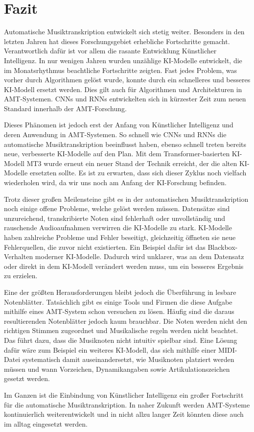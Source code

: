 \section{Fazit}
Automatische Musiktranskription entwickelt sich stetig weiter.
Besonders in den letzten Jahren hat dieses Forschungsgebiet erhebliche Fortschritte gemacht.
Verantwortlich dafür ist vor allem die rasante Entwicklung Künstlicher Intelligenz.
In nur wenigen Jahren wurden unzählige KI-Modelle entwickelt, die im Monatsrhythmus beachtliche Fortschritte zeigten.
Fast jedes Problem, was vorher durch Algorithmen gelöst wurde,
konnte durch ein schnelleres und besseres KI-Modell ersetzt werden.
Dies gilt auch für Algorithmen und Architekturen in AMT-Systemen.
CNNs und RNNs entwickelten sich in kürzester Zeit zum neuen Standard innerhalb der AMT-Forschung.

Dieses Phänomen ist jedoch erst der Anfang von Künstlicher Intelligenz und deren Anwendung in AMT-Systemen.
So schnell wie CNNs und RNNs die automatische Musiktranskription beeinflusst haben,
ebenso schnell treten bereits neue, verbesserte KI-Modelle auf den Plan.
Mit dem Transformer-basierten KI-Modell MT3 wurde erneut ein neuer Stand der Technik erreicht,
der die alten KI-Modelle ersetzten sollte.
Es ist zu erwarten, dass sich dieser Zyklus noch vielfach wiederholen wird,
da wir uns noch am Anfang der KI-Forschung befinden.

Trotz dieser großen Meilensteine gibt es in der automatischen Musiktranskription noch einige offene Probleme,
welche gelöst werden müssen.
Datensätze sind unzureichend, transkribierte Noten sind fehlerhaft oder unvollständig
und rauschende Audioaufnahmen verwirren die KI-Modelle zu stark.
KI-Modelle haben zahlreiche Probleme und Fehler beseitigt,
gleichzeitig öffneten sie neue Fehlerquellen, die zuvor nicht existierten.
Ein Beispiel dafür ist das Blackbox-Verhalten moderner KI-Modelle.
Dadurch wird unklarer, was an dem Datensatz oder direkt in dem KI-Modell verändert werden muss,
um ein besseres Ergebnis zu erzielen.

Eine der größten Herausforderungen bleibt jedoch die Überführung in lesbare Notenblätter.
Tatsächlich gibt es einige Tools und Firmen die diese Aufgabe mithilfe eines AMT-System schon versuchen zu lösen.
Häufig sind die daraus resultierenden Notenblätter jedoch kaum brauchbar.
Die Noten werden nicht den richtigen Stimmen zugeordnet und Musikalische regeln werden nicht beachtet.
Das führt dazu, dass die Musiknoten nicht intuitiv spielbar sind.
Eine Lösung dafür wäre zum Beispiel ein weiteres KI-Modell,
das sich mithilfe einer MIDI-Datei systematisch damit auseinandersetzt,
wie Musiknoten platziert werden müssen und wann Vorzeichen, Dynamikangaben sowie Artikulationszeichen gesetzt werden.

Im Ganzen ist die Einbindung von Künstlicher Intelligenz ein großer Fortschritt für die automatische Musiktranskription.
In naher Zukunft werden AMT-Systeme kontinuierlich weiterentwickelt
und in nicht allzu langer Zeit könnten diese auch im alltag eingesetzt werden.
